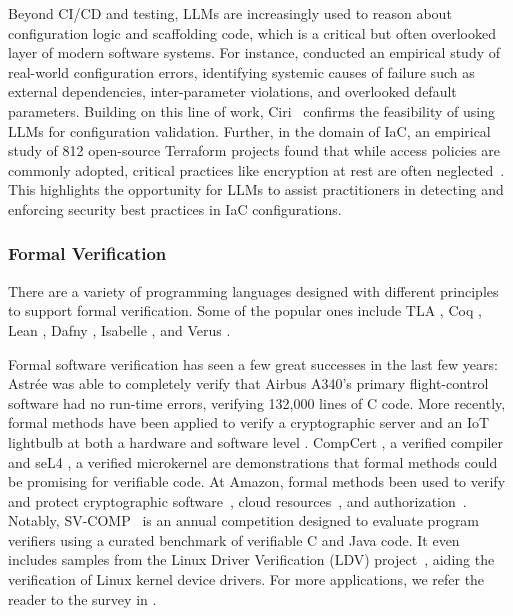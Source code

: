 Beyond CI/CD and testing, LLMs are increasingly used to reason about configuration logic and scaffolding code, which is a critical but often overlooked layer of modern software systems. 
For instance, \citet{yin2011configuration} conducted an empirical study of real-world configuration errors, identifying systemic causes of failure such as external dependencies, inter-parameter violations, and overlooked default parameters. 
Building on this line of work, Ciri~\citep{lian2024large} confirms the feasibility of using LLMs for configuration validation.
Further, in the domain of IaC, an empirical study of 812 open-source Terraform projects found that while access policies are commonly adopted, critical practices like encryption at rest are often neglected~\citep{verdet2023exploring}. 
This highlights the opportunity for LLMs to assist practitioners in detecting and enforcing security best practices in IaC configurations.


\subsubsection{Formal Verification}
There are a variety of programming languages designed with different principles to support formal verification. Some of the popular ones include TLA \citep{lamport1994introduction}, Coq \citep{Coq-refman}, Lean \citep{de2015lean}, Dafny \citep{leino2010dafny}, Isabelle \citep{nipkow2002isabelle}, and Verus \citep{lattuada2024verus}. 

Formal software verification has seen a few great successes in the last few years: Astrée \citep{cousot2005astree} was able to completely verify that Airbus A340's primary flight-control software had no run-time errors, verifying 132,000 lines of C code. 
More recently, formal methods have been applied to verify a cryptographic server \citep{erbsen2024foundational} and an IoT lightbulb at both a hardware and software level \citep{erbsen2021integration}. 
CompCert \citep{leroy2016compcert}, a verified compiler and seL4 \citep{klein2009sel4}, a verified microkernel are demonstrations that formal methods could be promising for verifiable code. 
At Amazon, formal methods been used to verify and protect cryptographic software~\citep{goel2024leanprover}, cloud resources~\citep{xu2024cloud}, and authorization~\citep{disselkoen2025cedar}. 
Notably, SV-COMP~\citep{beyer2023svcomp} is an annual competition designed to evaluate program verifiers using a curated benchmark of verifiable C and Java code. 
It even includes samples from the Linux Driver Verification (LDV) project~\citep{beyer2012ldv}, aiding the verification of Linux kernel device drivers.
For more applications, we refer the reader to the survey in \citet{huang2023lessons}.

